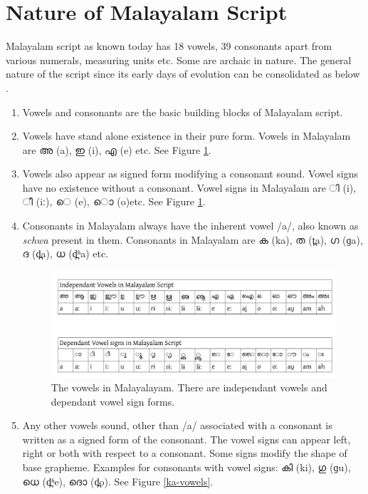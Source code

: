 \documentclass[10pt]{article}
\begin{document}
\section{Nature of Malayalam Script}
\label{scriptnature}
Malayalam script as known today has 18 vowels, 39 consonants apart from various numerals, measuring units etc. Some are archaic in nature. The general nature of the script since its early days of evolution can be consolidated as below \cite{kpanineeyam} .

\begin{enumerate}
	\item
	Vowels and consonants are the basic building blocks of Malayalam script.
	\item
	Vowels have stand alone existence in their pure form. Vowels in Malayalam are {\manjari അ} (a), {\manjari ഇ} (i), {\manjari എ} (e) etc. See Figure \ref{vowels}.
	\item
	Vowels also appear as signed form modifying a consonant sound. Vowel signs have no existence without a consonant. Vowel signs in Malayalam are {\manjari  ി} (i), {\manjari ീ} (iː), {\manjari െ} (e), {\manjari ൊ } (o)etc. See Figure  \ref{vowels}.
	\item Consonants in Malayalam always have the inherent vowel /a/, also known as \textit{schwa} present in them. Consonants in Malayalam are {\manjari ക} (ka), {\manjari ത} (t̪a), {\manjari ഗ} (ɡa), {\manjari ദ} (d̪a), {\manjari ധ} (d̪ʱa) etc.
	
	\begin{figure}[h!]
		\centering
		\includegraphics[width=\textwidth]{images/vowels.png}
		\caption{The vowels in Malayalayam. There are independant vowels and dependant vowel sign forms.}
		\label{vowels}
	\end{figure} 
	
	\item
	Any other vowels sound, other than /a/  associated with a consonant is written as a signed form of the consonant. The vowel signs can  appear left, right or both with respect to a consonant. Some signs modify the shape of base grapheme. Examples for consonants with vowel signs:  {\manjari കി} (ki), {\manjari ഗു} (ɡu), {\manjari ധെ} (d̪ʱe), {\manjari ദൊ} (d̪o). See Figure \ref{ka-vowels}.
	

\end{enumerate}
\end{document}
